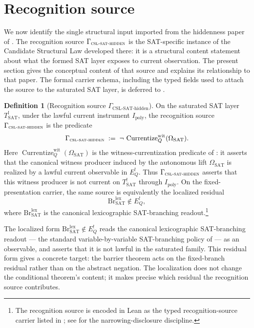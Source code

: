 \documentclass[11pt]{article}
\newcommand{\Tsat}{T^{!}_{\mathrm{SAT}}}
\newcommand{\Ipoly}{I_{\mathrm{poly}}}
\newcommand{\EQbang}{E^{!}_{Q}}
\newcommand{\OmegaSAT}{\Omega_{\mathrm{SAT}}}
\newcommand{\CurrentizeWit}{\operatorname{Currentize}^{\mathrm{wit}}_{Q}}
\newcommand{\CSLSATHidden}{\Gamma_{\textsc{csl-sat-hidden}}}
\newcommand{\CSLcore}{Candidate Structural Law}
\theoremstyle{definition}
\newtheorem{definition}[theorem]{Definition}
\begin{document}
\section{Recognition source}
\label{sec:recognition-source}

We now identify the single structural input imported from the
hiddenness paper of \citet{TsiokosHiddenness2026}.  The recognition
source \(\CSLSATHidden\) is the SAT-specific instance of the \CSLcore{}
developed there: it is a structural content statement about what the
formed SAT layer exposes to current observation.  The present section
gives the conceptual content of that source and explains its
relationship to that paper.  The formal carrier schema, including the
typed fields used to attach the source to the saturated SAT layer, is
deferred to .

\begin{definition}[Recognition source $\Gamma_{\mathrm{CSL\text{-}SAT\text{-}hidden}}$]
\label{def:pvnp:recognition-source-Gamma}
On the saturated SAT layer \(\Tsat\), under the lawful current
instrument \(\Ipoly\), the recognition source \(\CSLSATHidden\) is the
predicate
\[
  \CSLSATHidden
  \;:=\;
  \neg\,\CurrentizeWit(\OmegaSAT).
\]
Here \(\CurrentizeWit(\OmegaSAT)\) is the witness-currentization
predicate of : it asserts that the
canonical witness producer induced by the autonomous lift \(\OmegaSAT\)
is realized by a lawful current observable in \(\EQbang\).  Thus
\(\CSLSATHidden\) asserts that this witness producer is not current on
\(\Tsat\) through \(\Ipoly\).  On the fixed-presentation carrier, the
same source is equivalently the localized residual
\[
  \mathrm{Br}^{\mathrm{lex}}_{\mathrm{SAT}}\notin\EQbang,
\]
where \(\mathrm{Br}^{\mathrm{lex}}_{\mathrm{SAT}}\) is the canonical
lexicographic SAT-branching readout.\footnote{The recognition source
is encoded in Lean as the typed recognition-source carrier listed in
; see  for the
narrowing-disclosure discipline.}
\end{definition}

The localized form
\(\mathrm{Br}^{\mathrm{lex}}_{\mathrm{SAT}}\notin\EQbang\) reads the
canonical lexicographic SAT-branching readout --- the standard
variable-by-variable SAT-branching policy of
\citep{DavisLogemannLoveland1962MachineProgram,NieuwenhuisOliverasTinelli2006DPLL}
--- as an observable, and asserts that it is not lawful in the
saturated family.  This residual form gives 
a concrete target: the barrier theorem acts on the fixed-branch
residual rather than on the abstract negation.  The localization does
not change the conditional theorem's content; it makes precise which
residual the recognition source contributes.
\end{document}
